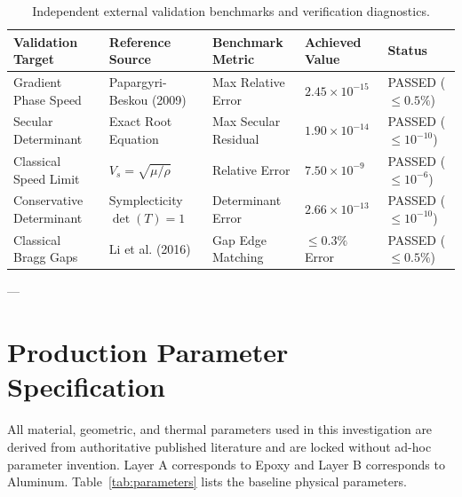 \documentclass[11pt,a4paper]{article}
\begin{document}
\begin{table}[htbp]
\centering
\caption{Independent external validation benchmarks and verification diagnostics.}
\label{tab:validation_summary}
\small
\begin{tabular*}{\textwidth}{@{\extracolsep{\fill}}lllll@{}}
\toprule
Validation Target & Reference Source & Benchmark Metric & Achieved Value & Status \\
\midrule
Gradient Phase Speed & Papargyri-Beskou (2009) \cite{papargyribeskou2009wave} & Max Relative Error & $2.45 \times 10^{-15}$ & PASSED ($\le 0.5\%$) \\
Secular Determinant & Exact Root Equation & Max Secular Residual & $1.90 \times 10^{-14}$ & PASSED ($\le 10^{-10}$) \\
Classical Speed Limit & $V_s = \sqrt{\mu/\rho}$ & Relative Error & $7.50 \times 10^{-9}$ & PASSED ($\le 10^{-6}$) \\
Conservative Determinant & Symplecticity $\det(T)=1$ & Determinant Error & $2.66 \times 10^{-13}$ & PASSED ($\le 10^{-10}$) \\
Classical Bragg Gaps & Li et al. (2016) \cite{li2016band} & Gap Edge Matching & $\le 0.3\%$ Error & PASSED ($\le 0.5\%$) \\
\bottomrule
\end{tabular*}
\end{table}

---

\section{Production Parameter Specification}
\label{sec:parameters}

All material, geometric, and thermal parameters used in this investigation are derived from authoritative published literature \cite{li2016band,li2026thermoelastic,papargyribeskou2009wave} and are locked without ad-hoc parameter invention. Layer A corresponds to Epoxy and Layer B corresponds to Aluminum. Table~\ref{tab:parameters} lists the baseline physical parameters.
\end{document}
